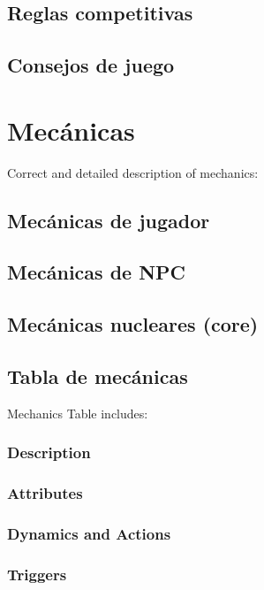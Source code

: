     \subsection{Reglas competitivas}

    \subsection{Consejos de juego}


\section{Mecánicas}
Correct and detailed description of mechanics:
    \subsection{Mecánicas de jugador}
    \subsection{Mecánicas de NPC}
    \subsection{Mecánicas nucleares (core)}
    \subsection{Tabla de mecánicas}
    Mechanics Table includes:
        \subsubsection{Description}
        \subsubsection{Attributes}
        \subsubsection{Dynamics and Actions}
        \subsubsection{Triggers}
